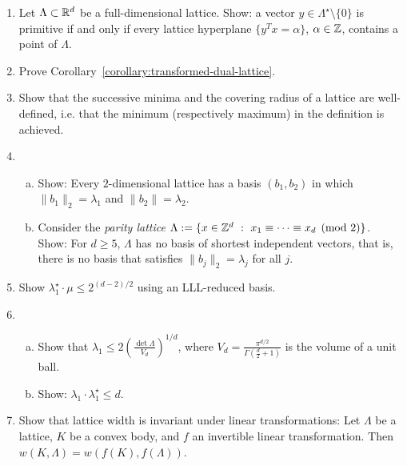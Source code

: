 \begin{enumerate}
  \item
    Let $\Lambda \subset \mathbb{R}^d$ be a full-dimensional lattice.
    Show: a vector $y \in \Lambda^\star \setminus \{0\}$ is primitive
    if and only if
    every lattice hyperplane $\{ y^T x = \alpha\}$, $\alpha \in \mathbb{Z}$, contains a point of $\Lambda$.

  \item Prove Corollary~\ref{corollary:transformed-dual-lattice}.

  \item
    Show that the successive minima and the covering radius of a lattice are well-defined,
    i.e. that the minimum (respectively maximum) in the definition is achieved.

  \item
    \begin{enumerate}[(a)]
    \item Show: Every $2$-dimensional lattice has a basis $(b_1, b_2)$
      in which $\|b_1\|_2 = \lambda_1$ and $\|b_2\| = \lambda_2$.

    \item
      Consider the \emph{parity lattice}
      $\Lambda := \{ x \in \mathbb{Z}^d ~:~ x_1 \equiv \dots \equiv x_d \pmod{2} \}$.
      Show: For $d \geq 5$, $\Lambda$ has no basis of shortest independent vectors,
      that is, there is no basis that satisfies $\|b_j\|_2 = \lambda_j$ for all $j$.
    \end{enumerate}

  \item
    Show $\lambda_1^\star \cdot \mu \leq 2^{(d-2)/2}$ using an LLL-reduced basis.

  \item
    \begin{enumerate}[(a)]
      \item Show that
        $\lambda_1 \leq 2 \left( \frac{\det \Lambda}{V_d} \right)^{1/d}$,
        where $V_d = \frac{\pi^{d/2}}{\Gamma(\frac{d}{2} + 1)}$ is the volume of a unit ball.

      \item Show: $\lambda_1 \cdot \lambda_1^\star \leq d$.
    \end{enumerate}

  \item
    Show that lattice width is invariant under linear transformations:
    Let $\Lambda$ be a lattice, $K$ be a convex body, and $f$ an invertible linear transformation.
    Then $w(K, \Lambda) = w(f(K), f(\Lambda))$.

\end{enumerate}

